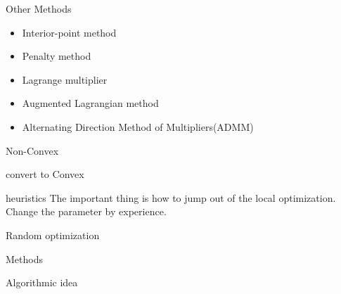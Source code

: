     \begin{frame}{Other Methods}
      \Large
      \begin{spacing}{1.5}
        \begin{itemize}
          \item Interior-point method
          \item Penalty method
          \item Lagrange multiplier
          \item Augmented Lagrangian method
          \item Alternating Direction Method of Multipliers(ADMM)
        \end{itemize}
      \end{spacing}
    \end{frame}

    \begin{frame}{Non-Convex}
      \item convert to Convex
      \item heuristics
      The important thing is how to jump out of the local optimization.
      Change the parameter by experience.
    \end{frame}

    \begin{frame}{Random optimization}
      \item Methods
      \item Algorithmic idea
    \end{frame}
